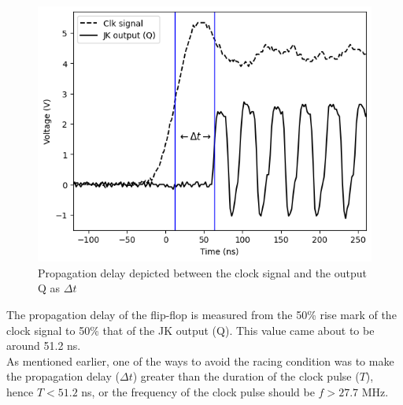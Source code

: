 \begin{figure}[H]
    \centering
    \includegraphics[width=1\columnwidth]{images/propagation.png}
    \caption{Propagation delay depicted between the clock signal and the output Q as $\Delta t$}
\end{figure}

The propagation delay of the flip-flop is measured from the 50\% rise mark of the clock signal to 50\% that of the JK output (Q). This value came about to be around 51.2 ns.\\

As mentioned earlier, one of the ways to avoid the racing condition was to make the propagation delay ($\Delta t$) greater than the duration of the clock pulse ($T$), hence $T < 51.2$ ns, or the frequency of the clock pulse should be $f > 27.7$ MHz.\\
